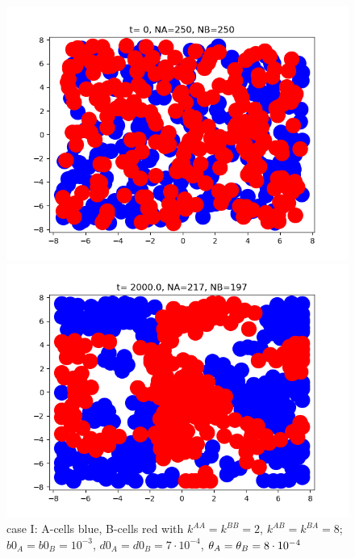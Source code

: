 




\begin{figure}[htb]
	\begin{minipage}[t]{.45\textwidth}
		\centering
		\includegraphics[width=\textwidth]{micro_ini_caseI1}
	\end{minipage}
	\hfill
	\begin{minipage}[t]{.45\textwidth}
		\centering
		\includegraphics[width=\textwidth]{micro_fin_caseI1}
	\end{minipage}  
	\label{fig:1-2}
	\caption{{case I: A-cells blue, B-cells red with $k^{AA}=k^{BB}=2 $, $k^{AB}=k^{BA}=8$; $b0_A=b0_B=10^{-3}$, $d0_A=d0_B=7\cdot10^{-4}$}, ${\theta}_A={\theta}_B=8\cdot 10^{-4}$}
\end{figure}


